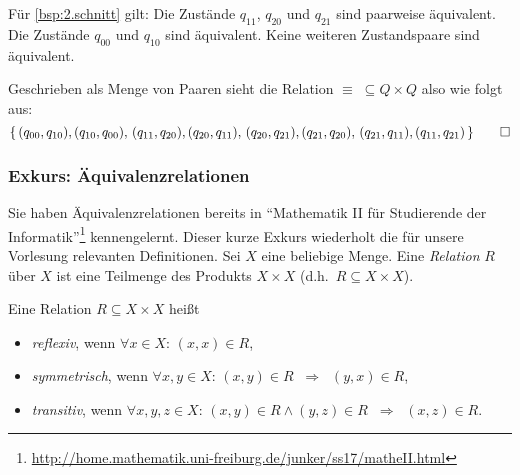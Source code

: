 \begin{Bsp}
Für \autoref{bsp:2.schnitt} gilt: 
Die Zustände $q_{11}$, $q_{20}$ und $q_{21}$ sind paarweise äquivalent.
Die Zustände $q_{00}$ und $q_{10}$ sind äquivalent.
Keine weiteren Zustandspaare sind äquivalent.

Geschrieben als Menge von Paaren sieht die Relation $\equiv\;\subseteq Q\times Q$ also wie folgt aus:
\[
\{ \,
(q_{00}, q_{10}), (q_{10}, q_{00}), \,
(q_{11}, q_{20}), (q_{20}, q_{11}), \,
(q_{20}, q_{21}), (q_{21}, q_{20}), \,
(q_{21}, q_{11}), (q_{11}, q_{21}) \,
\}\qedhere
\]
\end{Bsp}


\subsubsection{Exkurs: Äquivalenzrelationen}
Sie haben Äquivalenzrelationen bereits in "`Mathematik II für Studierende der Informatik"'\footnote{\url{http://home.mathematik.uni-freiburg.de/junker/ss17/matheII.html}} kennengelernt.
Dieser kurze Exkurs wiederholt die für unsere Vorlesung relevanten Definitionen.
Sei $X$ eine beliebige Menge. Eine \emph{Relation} $R$ über $X$ ist eine Teilmenge des Produkts $X\times X$ (d.h.\ $R\subseteq X\times X$).

Eine Relation $R\subseteq X\times X$ heißt
\begin{itemize}
 \item \emph{reflexiv}, wenn $\forall x\in X$: $(x,x)\in R$, 
 \item \emph{symmetrisch}, wenn $\forall x, y\in X$: $(x,y)\in R \;\; \Rightarrow\;\; (y,x)\in R$, 
 \item \emph{transitiv}, wenn $\forall x, y, z\in X$: $(x,y)\in R \land (y,z)\in R\;\; \Rightarrow\;\; (x,z)\in R$.
\end{itemize}

